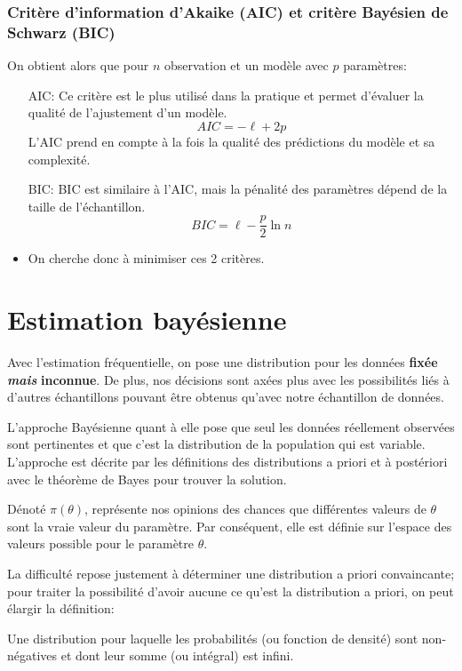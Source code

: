 \documentclass[10pt, french]{article}
\begin{document}
\begin{multicols*}{3}
\subsubsection*{Critère d'information d'Akaike (AIC) et critère Bayésien de Schwarz (BIC)}
On obtient alors que pour $n$ observation et un modèle avec $p$ paramètres:
\begin{itemize}
\item[AIC:] Ce critère est le plus utilisé dans la pratique et permet d'évaluer la qualité de l'ajustement d'un modèle. 
	\[ 
		AIC = - \ell + 2 p
	\]
L'AIC prend en compte à la fois la qualité des prédictions du modèle et sa complexité.
\item[BIC:] BIC est similaire à l'AIC, mais la pénalité des paramètres dépend de la taille de l'échantillon.
	\[ 
		BIC = \ell - \frac{p}{2} \ln n
	\]
\item On cherche donc à minimiser ces 2 critères.
\end{itemize}

\setcounter{section}{12}
\section{Estimation bayésienne}

Avec l'estimation fréquentielle, on pose une distribution pour les données \textbf{fixée} \textit{\textbf{mais}} \textbf{inconnue}. De plus, nos décisions sont axées plus avec les possibilités liés à d'autres échantillons pouvant être obtenus qu'avec notre échantillon de données.

L'approche Bayésienne quant à elle pose que seul les données réellement observées sont pertinentes et que c'est la distribution de la population qui est variable.
L'approche est décrite par les définitions des distributions a priori et à postériori avec le théorème de Bayes pour trouver la solution.

\begin{definition}
Dénoté $\pi(\theta)$, représente nos opinions des chances que différentes valeurs de $\theta$ sont la vraie valeur du paramètre. 
Par conséquent, elle est définie sur l'espace des valeurs possible pour le paramètre $\theta$.
\end{definition}

La difficulté repose justement à déterminer une distribution a priori convaincante; pour traiter la possibilité d'avoir aucune ce qu'est la distribution a priori, on peut élargir la définition:
\begin{definition}
Une distribution pour laquelle les probabilités (ou fonction de densité) sont non-négatives et dont leur somme (ou intégral) est infini.
\end{definition}


\end{multicols*}
\end{document}

